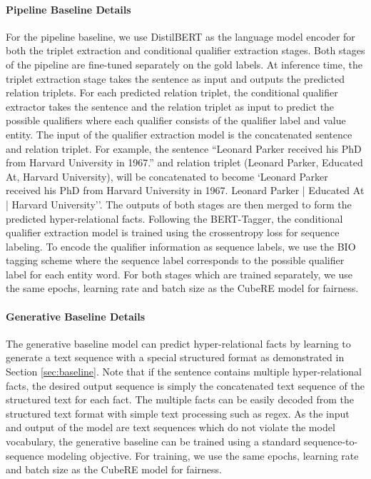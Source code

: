\documentclass[11pt]{article}
\newcommand{\modelname}{CubeRE}
\begin{document}
\paragraph{Pipeline Baseline Details}
For the pipeline baseline, we use DistilBERT as the language model encoder for both the triplet extraction and conditional qualifier extraction stages.
Both stages of the pipeline are fine-tuned separately on the gold labels.
At inference time, the triplet extraction stage takes the sentence as input and outputs the predicted relation triplets.
For each predicted relation triplet, the conditional qualifier extractor takes the sentence and the relation triplet as input to predict the possible qualifiers where each qualifier consists of the qualifier label and value entity.
The input of the qualifier extraction model is the concatenated sentence and relation triplet.
For example, the sentence ``Leonard Parker received his PhD from Harvard University in 1967.'' and relation triplet (Leonard Parker, Educated At, Harvard University), will be concatenated to become `Leonard Parker received his PhD from Harvard University in 1967. Leonard Parker | Educated At | Harvard University''.
The outputs of both stages are then merged to form the predicted hyper-relational facts.
Following the BERT-Tagger, the conditional qualifier extraction model is trained using the crossentropy loss for sequence labeling.
To encode the qualifier information as sequence labels, we use the BIO tagging scheme where the sequence label corresponds to the possible qualifier label for each entity word.
For both stages which are trained separately, we use the same epochs, learning rate and batch size as the \modelname{} model for fairness.

\paragraph{Generative Baseline Details}
The generative baseline model can predict hyper-relational facts by learning to generate a text sequence with a special structured format as demonstrated in Section \ref{sec:baseline}.
Note that if the sentence contains multiple hyper-relational facts, the desired output sequence is simply the concatenated text sequence of the structured text for each fact.
The multiple facts can be easily decoded from the structured text format with simple text processing such as regex.
As the input and output of the model are text sequences which do not violate the model vocabulary, the generative baseline can be trained using a standard sequence-to-sequence modeling objective.
For training, we use the same epochs, learning rate and batch size as the \modelname{} model for fairness.
\end{document}
